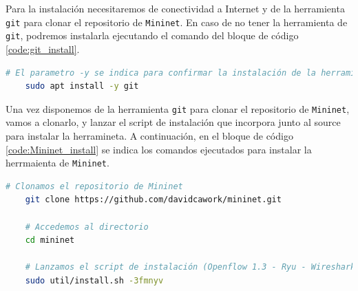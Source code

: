 Para la instalación necesitaremos de conectividad a Internet y de la herramienta \texttt{git} para clonar el repositorio de \texttt{Mininet}. En caso de no tener la herramienta de \texttt{git}, podremos instalarla ejecutando el comando del bloque de código \ref{code:git_install}.

\begin{lstlisting}[language= bash, style=Consola2, caption={Instalación de la herramienta git},label=code:git_install]
    # El parametro -y se indica para confirmar la instalación de la herramienta
    sudo apt install -y git 
\end{lstlisting}
\vspace{1cm}

Una vez disponemos de la herramienta \texttt{git} para clonar el repositorio de \texttt{Mininet}, vamos a clonarlo, y lanzar el script de instalación que incorpora junto al source para instalar la herramineta. A continuación, en el bloque de código \ref{code:Mininet_install} se indica los comandos ejecutados para instalar la herrmaienta de \texttt{Mininet}.


\begin{lstlisting}[language= bash, style=Consola2, caption={Instalación de la herramienta Mininet},label=code:Mininet_install]
    # Clonamos el repositorio de Mininet
    git clone https://github.com/davidcawork/mininet.git

    # Accedemos al directorio
    cd mininet

    # Lanzamos el script de instalación (Openflow 1.3 - Ryu - Wireshark dissector)
    sudo util/install.sh -3fmnyv
\end{lstlisting}
\vspace{1cm}


